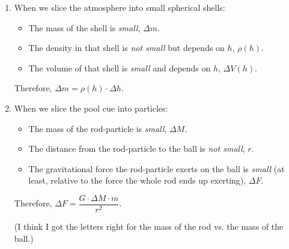 \documentclass[12pt]{article}
\begin{document}
\begin{enumerate}
\item When we slice the atmosphere into small spherical shells:
\begin{itemize}
    \item The mass of the shell is \textit{small}, \(\Delta m\).
    \item The density in that shell is \textit{not small} but depends on \(h\), \(\rho(h)\).
    \item The volume of that shell is \textit{small} and depends on \(h\), \(\Delta V(h)\).
\end{itemize}
Therefore, \(\Delta m = \rho(h) \cdot \Delta h\).

\item When we slice the pool cue into particles: 
\begin{itemize}
    \item The mass of the rod-particle is \textit{small}, \(\Delta M\).
    \item The distance from the rod-particle to the ball is \textit{not small}, \(r\).
    \item The gravitational force the rod-particle exerts on the ball is \textit{small} (at least, relative to the force the whole rod ends up exerting), \(\Delta F\).
\end{itemize}
Therefore, \(\Delta F = \dfrac{G \cdot \Delta M \cdot m}{r^2}\). 

(I think I got the letters right for the mass of the rod vs. the mass of the ball.)

\end{enumerate}
\end{document}
